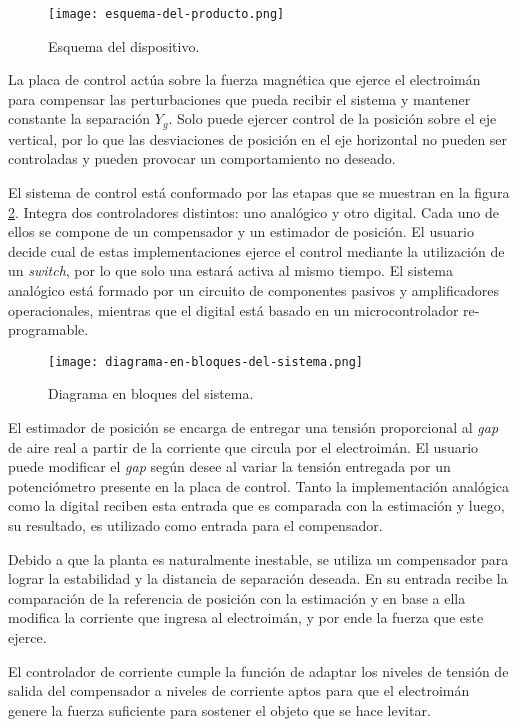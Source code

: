 \begin{figure}[H]
	\centering
	\texttt{[image: esquema-del-producto.png]}
	\caption{Esquema del dispositivo.}
	\label{fig:img_Esquema-del-producto}
\end{figure}


La placa de control actúa sobre la fuerza magnética que ejerce el electroimán para compensar las perturbaciones que pueda recibir el sistema y mantener constante la separación $Y_{g}$. Solo puede ejercer control de la posición sobre el eje vertical, por lo que las desviaciones de posición en el eje horizontal no pueden ser controladas y pueden provocar un comportamiento no deseado.

El sistema de control está conformado por las etapas que se muestran en la figura \ref{fig:img_diagrama-en-bloques-del-sistema}. Integra dos controladores distintos: uno analógico y otro digital. Cada uno de ellos se compone de un compensador y un estimador de posición.  El usuario decide cual de estas implementaciones ejerce el control mediante la utilización de un \textsl{switch}, por lo que solo una estará activa al mismo tiempo. El sistema analógico está formado por un circuito de  componentes pasivos y amplificadores operacionales, mientras que el digital está basado en un microcontrolador re-programable.

\begin{figure}[H]
	\centering
	\texttt{[image: diagrama-en-bloques-del-sistema.png]}
	\caption{Diagrama en bloques del sistema.}
	\label{fig:img_diagrama-en-bloques-del-sistema}
\end{figure}

\noindent El estimador de posición se encarga de entregar una tensión proporcional al \textsl{gap} de aire real a partir de la corriente que circula por el electroimán. El usuario puede modificar el \textsl{gap} según desee al variar la tensión entregada por un potenciómetro presente en la placa de control. Tanto la implementación analógica como la digital reciben esta entrada que es comparada con la estimación y luego, su resultado, es utilizado como entrada para el compensador.

Debido a que la planta es naturalmente inestable, se utiliza un compensador para lograr la estabilidad y la distancia de separación deseada. En su entrada recibe la comparación de la referencia de posición con la estimación y en base a ella modifica la corriente que ingresa al electroimán, y por ende la fuerza que este ejerce.

El controlador de corriente cumple la función de adaptar los niveles de tensión de salida del compensador a niveles de corriente aptos para que el electroimán genere la fuerza suficiente para sostener el objeto que se hace levitar.
 